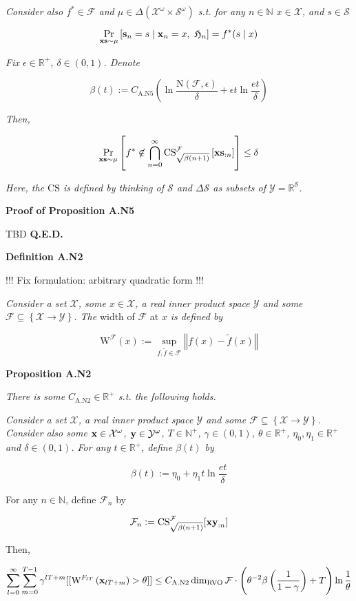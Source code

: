 \documentclass[a4paper]{article}
\newcommand{\Co}[1]{}
\newcommand{\AP}[1]{\left(#1\right)}
\newcommand{\AB}[1]{\left[#1\right]}
\newcommand{\AC}[1]{\left\{#1\right\}}
\newcommand{\ABM}[2]{\left[#1\;\middle\vert\;#2\right]}
\newcommand{\Pa}[2]{\underset{#1}{\operatorname{Pr}}\AB{#2}}
\newcommand{\CP}[3]{\underset{#1}{\operatorname{Pr}}\ABM{#2}{#3}}
\newcommand{\Nats}{\mathbb{N}}
\newcommand{\Reals}{\mathbb{R}}
\newcommand{\Norm}[1]{\left\Vert #1 \right\Vert}
\newcommand{\X}{\mathcal{X}}
\newcommand{\Y}{\mathcal{Y}}
\newcommand{\F}{\mathcal{F}}
\newcommand{\St}{\mathcal{S}}
\DeclareMathOperator{\RVO}{\dim_{RVO}}
\newcommand{\N}{\mathrm{N}}
\newcommand{\CS}{\mathrm{CS}}
\newcommand{\W}{\mathrm{W}}
\begin{document}
\textit{Consider also $f^*\in\F$ and $\mu\in\Delta\AP{\X^\omega\times\St^\omega}$ s.t. for any $n\in\Nats$ $x\in\X$, and $s\in\St$}\Co{i}

$$\CP{\bold{xs}\sim\mu}{\bold{s}_n=s}{\bold{x}_n=x,\ \mathfrak{H}_n} = f^*(s\mid x)$$

\textit{Fix $\epsilon\in\Reals^+$, $\delta\in(0,1)$. Denote}\Co{i}

$$\beta(t):=C_{\mathrm{A.N5}}\AP{\ln{\frac{\N(\F,\epsilon)}{\delta}}+\epsilon t\ln{\frac{et}{\delta}}}$$

\textit{Then,}\Co{i}

$$\Pa{\bold{xs}\sim\mu}{f^*\not\in\bigcap_{n=0}^\infty\CS^\F_{\sqrt{\beta(n+1)}}\AB{\bold{xs}_{:n}}} \leq \delta$$

\textit{Here, the $\CS$ is defined by thinking of $\St$ and $\Delta\St$ as subsets of $\Y=\Reals^\St$.}\Co{i}

\textbf{Proof of Proposition A.N5}\Co{b}

TBD \textbf{Q.E.D.}\Co{b}

\textbf{Definition A.N2}\Co{b}

!!! Fix formulation: arbitrary quadratic form !!!

\textit{Consider a set $\X$, some $x\in\X$, a real inner product space $\Y$ and some $\F\subseteq\AC{\X\rightarrow\Y}$. The}\Co{i} width of $\F$ at $x$ \textit{is defined by}\Co{i}

$$\W^\F(x):=\sup_{f,\tilde{f}\in\F}\Norm{f(x)-\tilde{f}(x)}$$  

\textbf{Proposition A.N2}\Co{b}

\textit{There is some $C_{\mathrm{A.N2}}\in\Reals^+$ s.t. the following holds.}\Co{i}

\textit{Consider a set $\X$, a real inner product space $\Y$ and some $\F\subseteq\AC{\X\rightarrow\Y}$. Consider also some $\bold{x}\in\X^\omega$, $\bold{y}\in\Y^\omega$, $T\in\Nats^+$, $\gamma\in(0,1)$, $\theta\in\Reals^+$, $\eta_0,\eta_1\in\Reals^+$ and $\delta\in(0,1)$. For any $t\in\Reals^+$, define $\beta(t)$ by}\Co{i}

$$\beta(t):=\eta_0 + \eta_1t\ln{\frac{et}{\delta}}$$

For any $n\in\Nats$, define $\F_n$ by

$$\F_n:=\CS^\F_{\sqrt{\beta(n+1)}}[\bold{xy}_{:n}]$$

Then,

$$\sum_{l=0}^\infty\sum_{m=0}^{T-1}{\gamma^{lT+m}[[\W^{F_{lT}}\AP{\bold{x}_{lT+m}}>\theta]]} \leq C_{\mathrm{A.N2}}\RVO{\F}\cdot\AP{\theta^{-2}\beta\AP{\frac{1}{1-\gamma}}+T}\ln{\frac{1}{\theta}}$$
\end{document}
